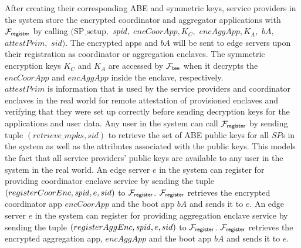 After creating their corresponding ABE and symmetric keys, service providers in the system store the encrypted coordinator and aggregator applications with $\mathcal{F}_{\mathsf{register}}$ by calling $(\mathrm{SP\_setup},$ $\mathit{spid},$ $encCoorApp,K_C,$  $encAggApp,K_A,$ $bA,$ $attestPrim,$ $sid)$. The encrypted apps and $bA$ will be sent to edge servers upon their registration as coordinator or aggregation enclaves. The symmetric encryption keys $K_C$ and $K_A$ are accessed by $\mathcal{F}_{\mathsf{tee}}$ when it decrypts the $encCoorApp$ and $encAggApp$ inside the enclave, respectively. \\$attestPrim$ is information that is used by the service providers and coordinator enclaves in the real world for remote attestation of provisioned enclaves and verifying that they were set up correctly before sending decryption keys for the applications and user data.  
Any user in the system can call $\mathcal{F}_{\mathsf{register}}$ by sending tuple $(retrieve\_mpks, sid)$ to retrieve the set of ABE public keys for all $SP$s in the system as well as the attributes associated with the public keys. 
This models the fact that all service providers' public keys are available to any user in the system in the real world. 
An edge server $e$ in the system can register for providing coordinator enclave service by sending the tuple $(registerCoorEnc,\mathit{spid},e,sid)$ to $\mathcal{F}_{\mathsf{register}}$. $\mathcal{F}_{\mathsf{register}}$ retrieves the encrypted coordinator app $encCoorApp$ and the boot app $bA$ and sends it to $e$. %
An edge server $e$ in the system can register for providing aggregation enclave service by sending the tuple $(registerAggEnc,\mathit{spid},e,sid)$ to $\mathcal{F}_{\mathsf{register}}$. $\mathcal{F}_{\mathsf{register}}$ retrieves the encrypted aggregation app, $encAggApp$ and the boot app $bA$ and sends it to $e$. %









